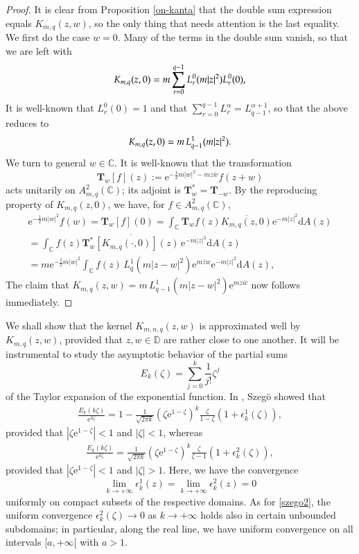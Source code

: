 \documentclass{birkart}
\theoremstyle{definition}
\theoremstyle{remark}
\numberwithin{equation}{section}
\numberwithin{figure}{section}
\newcommand{\e}{\mathrm e}
\newcommand{\1}{{\mathbf 1}}
\newcommand{\Rpar}{q}
\newcommand{\C}{{\mathbb C}}
\newcommand{\D}{{\mathbb D}}
\newcommand{\Tope}{{\mathbf T}}
\newcommand{\diff}{{\mathrm d}}
\begin{document}
\begin{proof}
It is clear from Proposition \ref{on-kanta} that the double sum expression
equals $K_{m,\Rpar}(z,w)$, so the only thing that needs attention is 
the last equality.
We first do the case $w=0$. Many of the terms in the double sum vanish,
so that we are left with
\begin{equation}
K_{m,\Rpar} (z,0)=m\sum_{r=0}^{\Rpar-1}L_r^{0}(m|z|^2)L_r^{0}(0),  
\notag
\end{equation}
It is well-known that $L_r^{0}(0)=1$ and that 
$\sum_{r=0}^{\Rpar-1} L^{\alpha}_r=L^{\alpha+1}_{\Rpar-1}$, so that 
the above reduces to
\begin{equation}
K_{m,\Rpar} (z,0) = m\, L^{1}_{\Rpar-1}(m|z|^2).  
\notag
\end{equation}
We turn to general $w \in\C$. It is well-known that the transformation
\[
\Tope_w[f](z):=\e^{-\frac12 m|w|^2-mz\bar w}f(z+w)
\]
acts unitarily on $A^2_{m,\Rpar}(\C)$; its adjoint is $\Tope_w^*=\Tope_{-w}$. 
By the reproducing property of $K_{m,\Rpar}(z,0)$, we have, for $f\in 
A^2_{m,\Rpar}(\C)$,
\begin{multline*}
\e^{-\frac12m|w|^2}f(w)=\Tope_w[f](0)=
\int_\C \Tope_w f(z)\overline{K_{m,\Rpar}(z,0)}\e^{-m|z|^2}\diff A(z)
\\
=\int_\C f(z)\overline{\Tope_w^*[K_{m,\Rpar}(\cdot,0)](z)}\,
\e^{-m|z|^2}\diff A(z)
\\
=m\e^{-\frac12m|w|^2}
\int_\C f(z)\,L^{1}_\Rpar(m|z-w|^2)\e^{m\bar z w}\e^{-m|z|^2}\diff A(z),
\end{multline*}
The claim that $K_{m,\Rpar}(z,w)= m\,L^{1}_{\Rpar-1}(m|z-w|^2) 
\e^{mz\bar{w}}$ now follows immediately.
\end{proof}
\medskip

We shall show that the kernel $K_{m,n,\Rpar}(z,w)$ 
is approximated well by $K_{m,\Rpar}(z,w)$, provided that $z,w\in\D$ are 
rather close to one another. It will be instrumental to study the asymptotic 
behavior of the partial sums 
\[
E_{k}(\zeta)=\sum_{j=0}^{k}\frac{1}{j!} \zeta^j
\]
of the Taylor expansion of the exponential function. In \cite{szego}, 
Szeg\"o showed that
\begin{align} 
\label{szego1}
\frac{E_k(k\zeta)}{\e^{k\zeta}}= 1-\frac{1}{\sqrt{2 \pi k}}
(\zeta\e^{1-\zeta})^k \frac{\zeta}{1-\zeta}
(1+\epsilon^{1}_k(\zeta)),
\end{align}
provided that $|\zeta\e^{1-\zeta}|<1$ and $|\zeta|<1$, whereas
\begin{align} 
\label{szego2}
\frac{E_k(k\zeta)}{\e^{k\zeta}}= \frac{1}{\sqrt{2 \pi k}}(\zeta
\e^{1-\zeta})^k \frac{\zeta}{\zeta-1}
(1+\epsilon^{2}_k(\zeta)),
\end{align}
provided that $|\zeta\e^{1-\zeta}|<1$ and $|\zeta|>1$. Here, we have the 
convergence
\[
\lim_{k\to+\infty}\epsilon^{1}_k(z)=\lim_{k\to+\infty} \epsilon^{2}_k(z)=0
\]
uniformly on compact subsets of the respective domains. As for \eqref{szego2},
the uniform convergence $\epsilon^{2}_k(\zeta)\to0$  as $k\to+\infty$ holds 
also in certain unbounded subdomains; in particular, along the 
real line, we have uniform convergence on all intervals $[a,+\infty[$ with 
$a>1$.
\medskip
\end{document}
